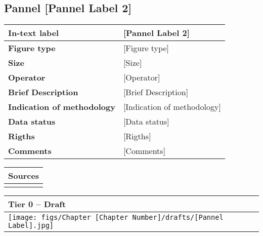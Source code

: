 \clearpage

\subsection{Pannel [Pannel Label 2]} \label{subsec_[Pannel Label 2]}

\small

\begin{table}[h!] %
\centering
\small %
\sffamily %
\begin{tabular}{| m{6cm} | m{8cm} |}
    \hline
    \textbf{In-text label} & [Pannel Label 2] \\
    \hline
    \textbf{Figure type} & [Figure type] \\
    \hline
    \textbf{Size} & [Size] \\
    \hline
    \textbf{Operator} & [Operator] \\
    \hline
    \textbf{Brief Description} & [Brief Description] \\
    \hline
    \textbf{Indication of methodology} & [Indication of methodology] \\
    \hline
    \textbf{Data status} & [Data status] \\
    \hline
    \textbf{Rigths} & [Rigths] \\
    \hline
    \textbf{Comments} & [Comments]\\
    \hline
    \end{tabular}
\end{table}

\begin{table}[h!] %
\centering
\small %
\sffamily %
\begin{tabular}{| m{14.5cm} |}
    \hline
    \textbf{Sources} \\
    \hline
    [Sources] \\
    \hline
    \end{tabular}
\end{table}

\begin{table}[h!] %
\centering
\small %
\sffamily %
\begin{tabular}{| m{14.5cm} |}
    \hline
    \textbf{Tier 0 -- Draft} \\
    \hline
    \hspace{5pt} \texttt{[image: figs/Chapter [Chapter Number]/drafts/[Pannel Label].jpg]} \\
    \hline
    \end{tabular}
\end{table}